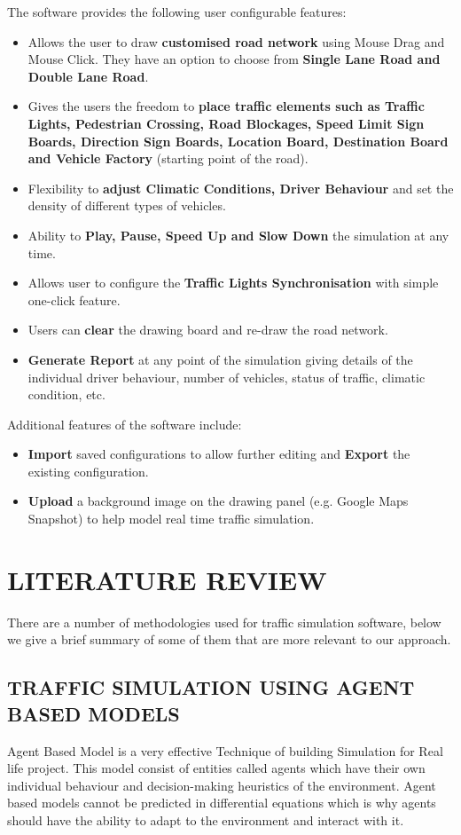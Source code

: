 \documentclass[11pt,a4paper]{article}
\begin{document}
	\setlength{\parindent}{0cm}\bigskip
	The software provides the following user configurable features:
		\begin{itemize}
		\setlength\itemsep{0.2em}
			\item Allows the user to draw \textbf{customised road network}  using Mouse Drag and Mouse Click. They have an option to choose from \textbf{Single Lane Road and Double Lane Road}. 
			\item Gives the users the freedom to \textbf{place traffic elements such as Traffic Lights, Pedestrian Crossing, Road Blockages, Speed Limit Sign Boards, Direction Sign Boards, Location Board, Destination Board and Vehicle Factory}  (starting point of the road).
			\item Flexibility to \textbf{adjust Climatic Conditions, Driver Behaviour}  and set the density of different types of vehicles.
			\item Ability to \textbf{Play, Pause, Speed Up and Slow Down}  the simulation at any time.
			\item Allows user to configure the \textbf{Traffic Lights Synchronisation}  with simple one-click feature.
			\item Users can \textbf{clear} the drawing board and re-draw the road network.
			\item \textbf{Generate Report} at any point of the simulation giving details of the individual driver behaviour, number of vehicles, status of traffic, climatic condition, etc.
		\end{itemize}
		Additional features of the software include:
		\begin{itemize}
		\setlength\itemsep{0.2em}
			\item \textbf{Import}  saved configurations to allow further editing and \textbf{Export} the existing configuration.
			\item \textbf{Upload} a background image on the drawing panel (e.g. Google Maps Snapshot) to help model real time traffic simulation.
		\end{itemize}

\section{\textbf{LITERATURE REVIEW}}
	There are a number of methodologies used for traffic simulation software, below we give a brief summary of some of them that are more relevant to our approach.
	
	\subsection{TRAFFIC SIMULATION USING AGENT BASED MODELS}
	Agent Based Model is a very effective Technique of building Simulation for Real life project. This model consist of entities called agents which have their own individual behaviour and decision-making heuristics of the environment. Agent based models cannot be predicted in differential equations which is why agents should have the ability to adapt to the environment and interact with it.\cite{Ljubović09}
	
\end{document}
